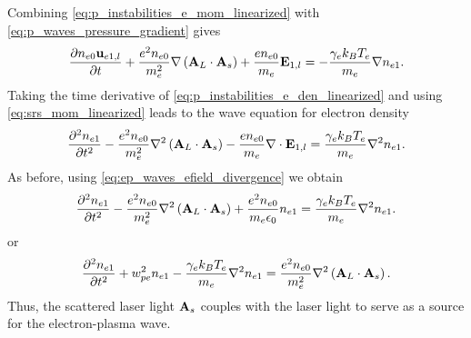 \documentclass[a4paper,11pt]{report}
\begin{document}
Combining \cref{eq:p_instabilities_e_mom_linearized} with \cref{eq:p_waves_pressure_gradient} gives 
\begin{equation}
    \label{eq:srs_mom_linearized}
    \frac{\partial n_{e0} \mathbf{u}_{e1,l}}{\partial t} + \frac{e^2 n_{e0}}{m_e^2} \nabla \left (\mathbf{A}_L \cdot \mathbf{A}_s \right ) + \frac{e n_{e0}}{m_e} \mathbf{E}_{1,l} = -\frac{\gamma_e k_B T_e}{m_e} \nabla n_{e1}.
\end{equation}
Taking the time derivative of \cref{eq:p_instabilities_e_den_linearized} and using \cref{eq:srs_mom_linearized} leads to the wave equation for electron density
\begin{equation*}
    \frac{\partial^2 n_{e1}}{\partial t^2} - \frac{e^2 n_{e0}}{m_e^2} \nabla^2 \left (\mathbf{A}_L \cdot \mathbf{A}_s \right ) - \frac{e n_{e0}}{m_e} \nabla \cdot \mathbf{E}_{1,l} = \frac{\gamma_e k_B T_e}{m_e} \nabla^2 n_{e1}.
\end{equation*}
As before, using \cref{eq:ep_waves_efield_divergence} we obtain
\begin{equation*}
    \frac{\partial^2 n_{e1}}{\partial t^2} - \frac{e^2 n_{e0}}{m_e^2} \nabla^2 \left (\mathbf{A}_L \cdot \mathbf{A}_s \right ) + \frac{e^2 n_{e0}}{m_e \epsilon_0} n_{e1} = \frac{\gamma_e k_B T_e}{m_e} \nabla^2 n_{e1}.
\end{equation*}
or
\begin{equation}
    \frac{\partial^2 n_{e1}}{\partial t^2} + w_{pe}^2 n_{e1} - \frac{\gamma_e k_B T_e}{m_e} \nabla^2 n_{e1} =   \frac{e^2 n_{e0}}{m_e^2} \nabla^2 \left (\mathbf{A}_L \cdot \mathbf{A}_s \right ).
\end{equation}
Thus, the scattered laser light $\mathbf{A}_s$ couples with the laser light to serve as a source for the electron-plasma wave.

\end{document}
